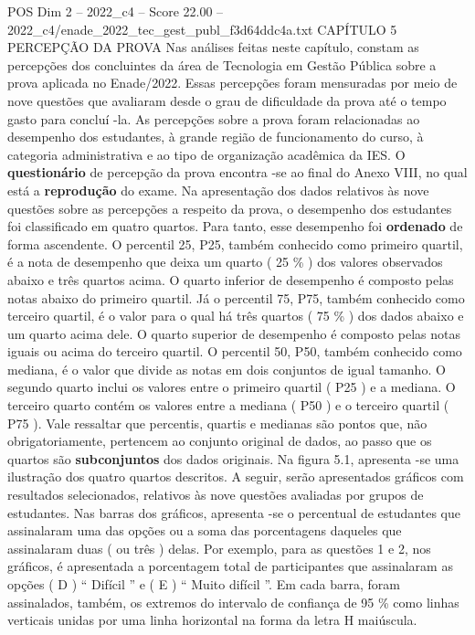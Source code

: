 \begin{textsample}{POS Dim 2 – 2022\_c4 – Score 22.00 – 2022\_c4/enade\_2022\_tec\_gest\_publ\_f3d64ddc4a.txt}  \label{ex:f2_pos_025}
CAPÍTULO 5 PERCEPÇÃO DA PROVA Nas análises feitas neste capítulo, constam as percepções dos concluintes da área de Tecnologia em Gestão Pública sobre a prova aplicada no Enade/2022.
Essas percepções foram mensuradas por meio de nove questões que avaliaram desde o grau de dificuldade da prova até o tempo gasto para concluí -la.
As percepções sobre a prova foram relacionadas ao desempenho dos estudantes, à grande região de funcionamento do curso, à categoria administrativa e ao tipo de organização acadêmica da IES.
O \textbf{questionário} de percepção da prova encontra -se ao final do Anexo VIII, no qual está a \textbf{reprodução} do exame.
Na apresentação dos dados relativos às nove questões sobre as percepções a respeito da prova, o desempenho dos estudantes foi classificado em quatro quartos.
Para tanto, esse desempenho foi \textbf{ordenado} de forma ascendente.
O percentil 25, P25, também conhecido como primeiro quartil, é a nota de desempenho que deixa um quarto ( 25 \% ) dos valores observados abaixo e três quartos acima.
O quarto inferior de desempenho é composto pelas notas abaixo do primeiro quartil.
Já o percentil 75, P75, também conhecido como terceiro quartil, é o valor para o qual há três quartos ( 75 \% ) dos dados abaixo e um quarto acima dele.
O quarto superior de desempenho é composto pelas notas iguais ou acima do terceiro quartil.
O percentil 50, P50, também conhecido como mediana, é o valor que divide as notas em dois conjuntos de igual tamanho.
O segundo quarto inclui os valores entre o primeiro quartil ( P25 ) e a mediana.
O terceiro quarto contém os valores entre a mediana ( P50 ) e o terceiro quartil ( P75 ).
Vale ressaltar que percentis, quartis e medianas são pontos que, não obrigatoriamente, pertencem ao conjunto original de dados, ao passo que os quartos são \textbf{subconjuntos} dos dados originais.
Na figura 5.1, apresenta -se uma ilustração dos quatro quartos descritos.
A seguir, serão apresentados gráficos com resultados selecionados, relativos às nove questões avaliadas por grupos de estudantes.
Nas barras dos gráficos, apresenta -se o percentual de estudantes que assinalaram uma das opções ou a soma das porcentagens daqueles que assinalaram duas ( ou três ) delas.
Por exemplo, para as questões 1 e 2, nos gráficos, é apresentada a porcentagem total de participantes que assinalaram as opções ( D ) “ Difícil ” e ( E ) “ Muito difícil ”.
Em cada barra, foram assinalados, também, os extremos do intervalo de confiança de 95 \% como linhas verticais unidas por uma linha horizontal na forma da letra H maiúscula.

\end{textsample}
